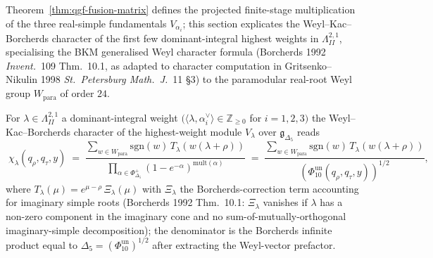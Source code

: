 Theorem~\ref{thm:qgf-fusion-matrix} defines the projected
finite-stage multiplication of the three real-simple fundamentals
\(V_{\alpha_i}\); this section
explicates the Weyl--Kac--Borcherds character of the first few
dominant-integral highest weights in $\Lambda^{2,1}_{II}$, specialising
the BKM generalised Weyl character formula
(Borcherds 1992 \emph{Invent.}~109 Thm.~10.1, as adapted to
character computation in Gritsenko--Nikulin 1998
\emph{St.~Petersburg Math.~J.}~11 \S3) to the paramodular real-root
Weyl group $W_{\mathrm{para}}$ of order $24$.

\begin{theorem}
\label{thm:qgf-wkb-character}
For $\lambda\in\Lambda^{2,1}_{II}$ a dominant-integral weight
$(\langle\lambda,\alpha_i^\vee\rangle\in\mathbb Z_{\geq 0}$ for
$i=1,2,3)$ the Weyl--Kac--Borcherds character of the highest-weight
module $V_\lambda$ over $\mathfrak g_{\Delta_5}$ reads
\[
 \boxed{\;
 \chi_\lambda(q_\rho, q_\tau, y)
 \;=\;
 \frac{\sum_{w\in W_{\mathrm{para}}}\mathrm{sgn}(w)\,
 T_\lambda(w(\lambda+\rho))}
 {\prod_{\alpha\in\Phi^+_{\Delta_5}}
 (1 - e^{-\alpha})^{\mathrm{mult}(\alpha)}}
 \;=\;
 \frac{\sum_{w\in W_{\mathrm{para}}}\mathrm{sgn}(w)\,
 T_\lambda(w(\lambda+\rho))}
 {(\Phi_{10}^{\mathrm{un}}(q_\rho, q_\tau, y))^{1/2}},
 \;}
\]
where $T_\lambda(\mu) = e^{\mu-\rho}\,\Xi_\lambda(\mu)$ with
$\Xi_\lambda$ the Borcherds-correction term accounting for
imaginary simple roots
(Borcherds 1992 Thm.~10.1: $\Xi_\lambda$ vanishes if $\lambda$ has a
non-zero component in the imaginary cone and no sum-of-mutually-orthogonal
imaginary-simple decomposition); the denominator is the Borcherds
infinite product equal to
$\Delta_5 = (\Phi_{10}^{\mathrm{un}})^{1/2}$ after extracting
the Weyl-vector prefactor.
\end{theorem}


